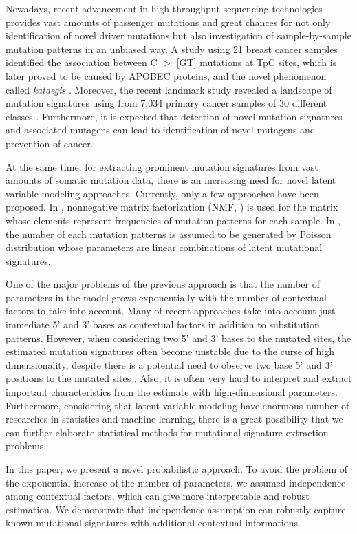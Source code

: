 Nowadays, recent advancement in high-throughput sequencing technologies provides vast amounts of passenger mutations
and great chances for not only identification of novel driver mutations but also investigation of sample-by-sample mutation patterns in an unbiased way. 
A study using 21 breast cancer samples identified the association between C $>$ [GT] mutations at TpC sites, 
which is later proved to be caused by APOBEC proteins, and the novel phenomenon called {\it kataegis} \cite{pmid22608084}. 
Moreover, the recent landmark study revealed a landscape of mutation signatures using from 7,034 primary cancer samples of 30 different classes \cite{pmid23945592}. 
Furthermore, it is expected that detection of novel mutation signatures and associated mutagens can lead to identification of novel mutagens and prevention of cancer.


At the same time, for extracting prominent mutation signatures from vast amounts of somatic mutation data,
there is an increasing need for novel latent variable modeling approaches.
Currently, only a few approaches have been proposed. 
In \cite{pmid23318258}, nonnegative matrix factorization (NMF, \cite{pmid10548103}) is used for the matrix whose elements represent frequencies of mutation patterns for each sample. 
In \cite{pmid23628380}, the number of each mutation patterns is assumed to be generated by Poisson distribution whose parameters are linear combinations of latent mutational signatures. 


One of the major problems of the previous approach is that 
the number of parameters in the model grows exponentially 
with the number of contextual factors to take into account.
Many of recent approaches take into account just immediate 5' and 3' bases as contextual factors in addition to substitution patterns.
However, when considering two 5' and 3' bases to the mutated sites,
the estimated mutation signatures often become unstable due to the curse of high dimensionality, 
despite there is a potential need to observe two base 5' and 3' positions to the mutated sites \cite{pmid9683596}.
Also, it is often very hard to interpret and extract important characteristics from the estimate with high-dimensional parameters.
Furthermore, considering that latent variable modeling have enormous number of researches in statistics and machine learning, 
there is a great possibility that we can further elaborate statistical methods for mutational signature extraction problems.

In this paper, we present a novel probabilistic approach.
To avoid the problem of the exponential increase of the number of parameters,
we assumed independence among contextual factors, which can give more interpretable and robust estimation.
We demonstrate that independence assumption can robustly capture known mutational signatures with additional contextual informations.


